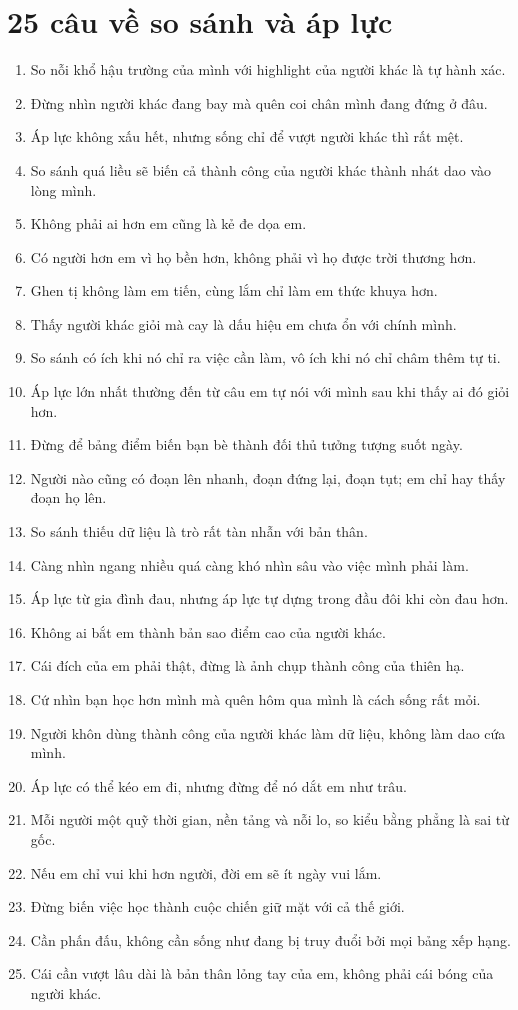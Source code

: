 \section{25 câu về so sánh và áp lực}
\begin{enumerate}[leftmargin=*,resume]
\item So nỗi khổ hậu trường của mình với highlight của người khác là tự hành xác.
\item Đừng nhìn người khác đang bay mà quên coi chân mình đang đứng ở đâu.
\item Áp lực không xấu hết, nhưng sống chỉ để vượt người khác thì rất mệt.
\item So sánh quá liều sẽ biến cả thành công của người khác thành nhát dao vào lòng mình.
\item Không phải ai hơn em cũng là kẻ đe dọa em.
\item Có người hơn em vì họ bền hơn, không phải vì họ được trời thương hơn.
\item Ghen tị không làm em tiến, cùng lắm chỉ làm em thức khuya hơn.
\item Thấy người khác giỏi mà cay là dấu hiệu em chưa ổn với chính mình.
\item So sánh có ích khi nó chỉ ra việc cần làm, vô ích khi nó chỉ châm thêm tự ti.
\item Áp lực lớn nhất thường đến từ câu em tự nói với mình sau khi thấy ai đó giỏi hơn.
\item Đừng để bảng điểm biến bạn bè thành đối thủ tưởng tượng suốt ngày.
\item Người nào cũng có đoạn lên nhanh, đoạn đứng lại, đoạn tụt; em chỉ hay thấy đoạn họ lên.
\item So sánh thiếu dữ liệu là trò rất tàn nhẫn với bản thân.
\item Càng nhìn ngang nhiều quá càng khó nhìn sâu vào việc mình phải làm.
\item Áp lực từ gia đình đau, nhưng áp lực tự dựng trong đầu đôi khi còn đau hơn.
\item Không ai bắt em thành bản sao điểm cao của người khác.
\item Cái đích của em phải thật, đừng là ảnh chụp thành công của thiên hạ.
\item Cứ nhìn bạn học hơn mình mà quên hôm qua mình là cách sống rất mỏi.
\item Người khôn dùng thành công của người khác làm dữ liệu, không làm dao cứa mình.
\item Áp lực có thể kéo em đi, nhưng đừng để nó dắt em như trâu.
\item Mỗi người một quỹ thời gian, nền tảng và nỗi lo, so kiểu bằng phẳng là sai từ gốc.
\item Nếu em chỉ vui khi hơn người, đời em sẽ ít ngày vui lắm.
\item Đừng biến việc học thành cuộc chiến giữ mặt với cả thế giới.
\item Cần phấn đấu, không cần sống như đang bị truy đuổi bởi mọi bảng xếp hạng.
\item Cái cần vượt lâu dài là bản thân lỏng tay của em, không phải cái bóng của người khác.
\end{enumerate}

